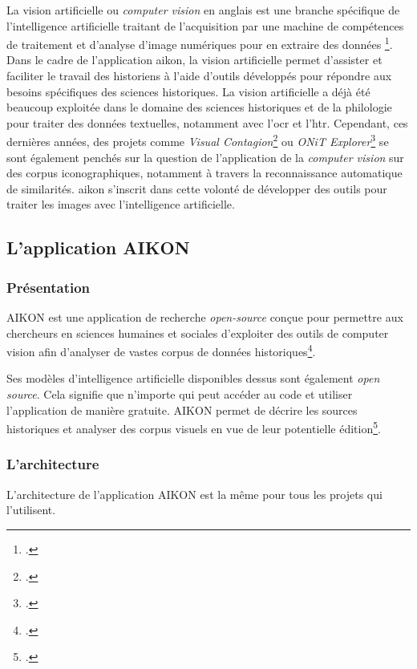La vision artificielle ou \textit{computer vision} en anglais est \og une branche spécifique de l'intelligence artificielle traitant de l'acquisition par une machine de compétences de traitement et d'analyse d'image numériques pour en extraire des données \fg \footcite{norindrTraitementSourcesHistoriques2023}.
Dans le cadre de l'application \gls{aikon}, la vision artificielle permet d'assister et faciliter le travail des historiens à l'aide d'outils développés pour répondre aux besoins spécifiques des sciences historiques.
La vision artificielle a déjà été beaucoup exploitée dans le domaine des sciences historiques et de la philologie pour traiter des données textuelles, notamment avec l'\gls{ocr} et l'\gls{htr}. Cependant, ces dernières années, des projets comme \textit{Visual Contagion}\footcite{HomeVisualContagions} ou \textit{ONiT Explorer}\footcite{ONiTExplorer} se sont également penchés sur la question de l'application de la \textit{computer vision} sur des corpus iconographiques, notamment à travers la reconnaissance automatique de similarités. \gls{aikon} s'inscrit dans cette volonté de développer des outils pour traiter les images avec l'intelligence artificielle. 

\subsection{L'application AIKON}

\subsubsection{Présentation}
AIKON est une application de recherche \textit{open-source} conçue pour permettre aux chercheurs en sciences humaines et sociales d'exploiter des outils de computer vision afin d'analyser de vastes corpus de données historiques\footcite{aikonAikonplatformAikon2025}. 


Ses modèles d'intelligence artificielle disponibles dessus sont également \textit{open source}. Cela signifie que n'importe qui peut accéder au code et utiliser l'application de manière gratuite. 
AIKON permet de décrire les sources historiques et analyser des corpus visuels en vue de leur potentielle édition\footcite{albouyAIKONComputerVision}.

\subsubsection{L'architecture}

L'architecture de l'application AIKON est la même pour tous les projets qui l'utilisent.

